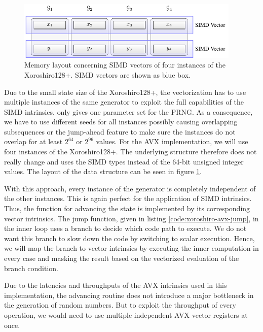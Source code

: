\documentclass{stdlocal}
\begin{document}
    \begin{figure}
      \center
      \includegraphics[width=0.95\textwidth]{figures/xrsr128p_vector_layout.pdf}
      \caption[Xoroshiro128+ Vector Layout]{%
        Memory layout concerning SIMD vectors of four instances of the Xoroshiro128+.
        SIMD vectors are shown as blue box.
      }
      \label{fig:xoroshiro-vector-layout}
    \end{figure}

    Due to the small state size of the Xoroshiro128+, the vectorization has to use multiple instances of the same generator to exploit the full capabilities of the SIMD intrinsics.
    \citeauthor{vigna-xoroshiro} only gives one parameter set for the PRNG.
    As a consequence, we have to use different seeds for all instances possibly causing overlapping subsequences or the jump-ahead feature to make sure the instances do not overlap for at least $2^{64}$ or $2^{96}$ values.
    For the AVX implementation, we will use four instances of the Xoroshiro128+.
    The underlying structure therefore does not really change and uses the SIMD types instead of the 64-bit unsigned integer values.
    The layout of the data structure can be seen in figure \ref{fig:xoroshiro-vector-layout}.

    With this approach, every instance of the generator is completely independent of the other instances.
    This is again perfect for the application of SIMD intrinsics.
    Thus, the function for advancing the state is implemented by its corresponding vector intrinsics.
    The jump function, given in listing \ref{code:xoroshiro-avx-jump}, in the inner loop uses a branch to decide which code path to execute.
    We do not want this branch to slow down the code by switching to scalar execution.
    Hence, we will map the branch to vector intrinsics by executing the inner computation in every case and masking the result based on the vectorized evaluation of the branch condition.

    Due to the latencies and throughputs of the AVX intrinsics used in this implementation, the advancing routine does not introduce a major bottleneck in the generation of random numbers.
    But to exploit the throughput of every operation, we would need to use multiple independent AVX vector registers at once.
\end{document}
